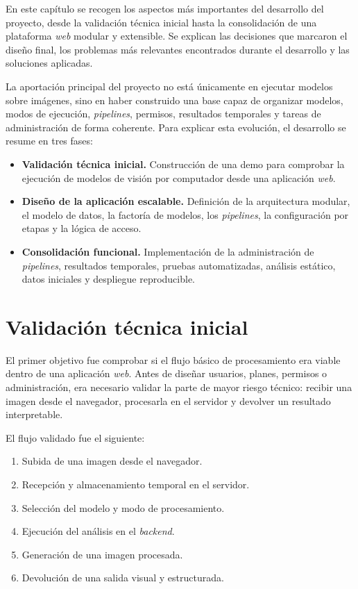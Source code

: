
En este capítulo se recogen los aspectos más importantes del desarrollo del proyecto, desde la validación técnica inicial hasta la consolidación de una plataforma \textit{web} modular y extensible. Se explican las decisiones que marcaron el diseño final, los problemas más relevantes encontrados durante el desarrollo y las soluciones aplicadas.

La aportación principal del proyecto no está únicamente en ejecutar modelos sobre imágenes, sino en haber construido una base capaz de organizar modelos, modos de ejecución, \textit{pipelines}, permisos, resultados temporales y tareas de administración de forma coherente. Para explicar esta evolución, el desarrollo se resume en tres fases:

\begin{itemize}
	\item \textbf{Validación técnica inicial.} Construcción de una demo para comprobar la ejecución de modelos de visión por computador desde una aplicación \textit{web}.
	\item \textbf{Diseño de la aplicación escalable.} Definición de la arquitectura modular, el modelo de datos, la factoría de modelos, los \textit{pipelines}, la configuración por etapas y la lógica de acceso.
	\item \textbf{Consolidación funcional.} Implementación de la administración de \textit{pipelines}, resultados temporales, pruebas automatizadas, análisis estático, datos iniciales y despliegue reproducible.
\end{itemize}

\section{Validación técnica inicial}

El primer objetivo fue comprobar si el flujo básico de procesamiento era viable dentro de una aplicación \textit{web}. Antes de diseñar usuarios, planes, permisos o administración, era necesario validar la parte de mayor riesgo técnico: recibir una imagen desde el navegador, procesarla en el servidor y devolver un resultado interpretable.

El flujo validado fue el siguiente:

\begin{enumerate}
	\item Subida de una imagen desde el navegador.
	\item Recepción y almacenamiento temporal en el servidor.
	\item Selección del modelo y modo de procesamiento.
	\item Ejecución del análisis en el \textit{backend}.
	\item Generación de una imagen procesada.
	\item Devolución de una salida visual y estructurada.
\end{enumerate}

